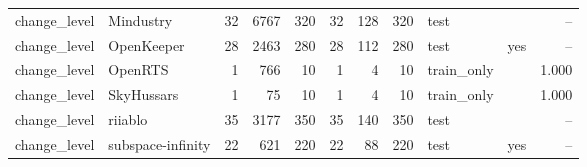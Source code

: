\begin{table}[htbp]
{\begin{tabular}{llrrrrrrllr}
change\_level & Mindustry & 32 & 6767 & 320 & 32 & 128 & 320 & test &  & -- \\
change\_level & OpenKeeper & 28 & 2463 & 280 & 28 & 112 & 280 & test & yes & -- \\
change\_level & OpenRTS & 1 & 766 & 10 & 1 & 4 & 10 & train\_only &  & 1.000 \\
change\_level & SkyHussars & 1 & 75 & 10 & 1 & 4 & 10 & train\_only &  & 1.000 \\
change\_level & riiablo & 35 & 3177 & 350 & 35 & 140 & 350 & test &  & -- \\
change\_level & subspace-infinity & 22 & 621 & 220 & 22 & 88 & 220 & test & yes & -- \\
\bottomrule
\end{tabular}}
\end{table}
